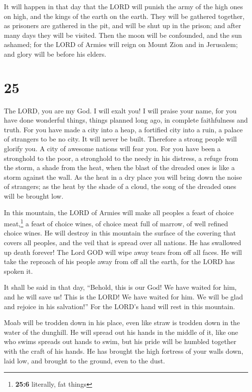  It will happen in that day that the LORD will punish the
army of the high ones on high, and the kings of the earth on the earth.
 They will be gathered together, as prisoners are
gathered in the pit, and will be shut up in the prison; and after many
days they will be visited.  Then the moon will be
confounded, and the sun ashamed; for the LORD of Armies will reign on
Mount Zion and in Jerusalem; and glory will be before his elders.

\hypertarget{section-24}{%
\section{25}\label{section-24}}

 The LORD, you are my God. I will exalt you! I will praise
your name, for you have done wonderful things, things planned long ago,
in complete faithfulness and truth.  For you have made a
city into a heap, a fortified city into a ruin, a palace of strangers to
be no city. It will never be built.  Therefore a strong
people will glorify you. A city of awesome nations will fear you.
 For you have been a stronghold to the poor, a stronghold
to the needy in his distress, a refuge from the storm, a shade from the
heat, when the blast of the dreaded ones is like a storm against the
wall.  As the heat in a dry place you will bring down the
noise of strangers; as the heat by the shade of a cloud, the song of the
dreaded ones will be brought low.

 In this mountain, the LORD of Armies will make all
peoples a feast of choice meat,\footnote{\textbf{25:6} literally, fat
  things} a feast of choice wines, of choice meat full of marrow, of
well refined choice wines.  He will destroy in this
mountain the surface of the covering that covers all peoples, and the
veil that is spread over all nations.  He has swallowed up
death forever! The Lord GOD will wipe away tears from off all faces. He
will take the reproach of his people away from off all the earth, for
the LORD has spoken it.

 It shall be said in that day, ``Behold, this is our God!
We have waited for him, and he will save us! This is the LORD! We have
waited for him. We will be glad and rejoice in his salvation!''
 For the LORD's hand will rest in this mountain.

Moab will be trodden down in his place, even like straw is trodden down
in the water of the dunghill.  He will spread out his
hands in the middle of it, like one who swims spreads out hands to swim,
but his pride will be humbled together with the craft of his hands.
 He has brought the high fortress of your walls down,
laid low, and brought to the ground, even to the dust.


